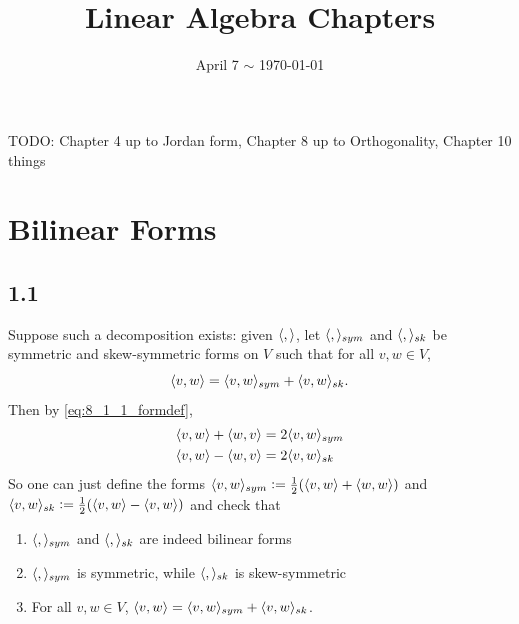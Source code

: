 \documentclass[12pt]{article}
\title{\course\ \\ Linear Algebra Chapters }
\author{\myname}
\date{April 7 $\sim$ \today}
\newcommand{\form}[2]{\<#1, #2\>}
\begin{document}
\maketitle
\thispagestyle{fancy}


TODO: Chapter 4 up to Jordan form, Chapter 8 up to Orthogonality, Chapter 10 things

\setcounter{section}{7}
\section{Bilinear Forms}
\subsection*{1.1} 
\newcommand{\symform}[2]{\form{#1}{#2}_{sym}}
\newcommand{\skewform}[2]{\form{#1}{#2}_{sk}}
Suppose such a decomposition exists: 
given $\form{}{}$, let $\symform{}{}$ and $\skewform{}{}$ be symmetric and skew-symmetric forms on $V$ such that for all $v, w \in V$, 
\begin{equation} \label{eq:8_1_1_formdef} 
  \form{v}{w} = \symform{v}{w} + \skewform{v}{w}.
\end{equation}
Then by \eqref{eq:8_1_1_formdef}, 
\begin{align*} 
  \form{v}{w} + \form{w}{v} & = 2\symform{v}{w} \\ 
  \form{v}{w} - \form{w}{v} & = 2\skewform{v}{w}
\end{align*}
So one can just define the forms $\symform{v}{w} \defeq \frac{1}{2}(\form{v}{w} + \form{w}{w})$ and $\skewform{v}{w} \defeq \frac{1}{2}(\form{v}{w} - \form{v}{w})$ and check that 
\begin{enumerate}
  \item $\symform{}{}$ and $\skewform{}{}$ are indeed bilinear forms 
  \item $\symform{}{}$ is symmetric, while $\skewform{}{}$ is skew-symmetric
  \item For all $v, w \in V$, $\form{v}{w} = \symform{v}{w} + \skewform{v}{w}$. 
\end{enumerate}
\end{document}
